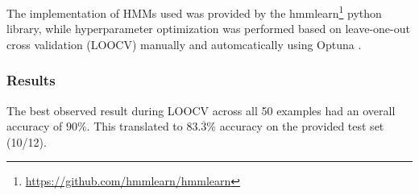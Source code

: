 \documentclass[times,twocolumn,final]{elsarticle}
\begin{document}
The implementation of HMMs used was provided by the hmmlearn\footnote{\url{https://github.com/hmmlearn/hmmlearn}} python library, while hyperparameter optimization was performed based on leave-one-out cross validation (LOOCV) manually and automcatically using Optuna \citep{akibaOptunaNextgenerationHyperparameter2019}.

\subsubsection{Results}

The best observed result during LOOCV across all 50 examples had an overall accuracy of $90\%$. This translated to $83.\overline{3}\%$ accuracy on the provided test set (10/12).




\end{document}
